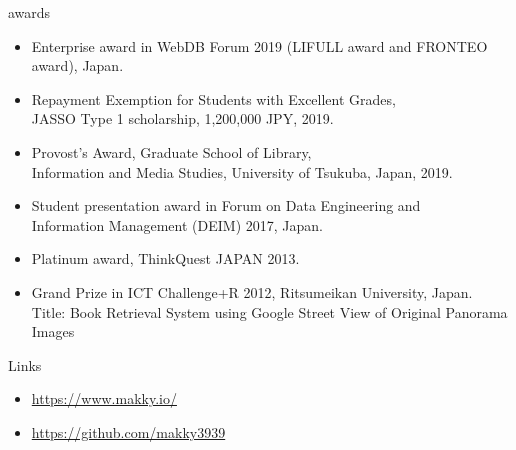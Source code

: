 \documentclass{resume} %
\begin{document}
\begin{rSection}{awards}
\begin{itemize}
  \item Enterprise award in WebDB Forum 2019 (LIFULL award and FRONTEO award), Japan.
  \item Repayment Exemption for Students with Excellent Grades, \\JASSO Type 1 scholarship, 1,200,000 JPY, 2019.
  \item Provost’s Award, Graduate School of Library, \\Information and Media Studies, University of Tsukuba, Japan, 2019.
  \item Student presentation award in Forum on Data Engineering
  and \\Information Management (DEIM) 2017, Japan.
  \item Platinum award, ThinkQuest JAPAN 2013. %
  \item Grand Prize in ICT Challenge+R 2012, Ritsumeikan University, Japan. \\Title: Book Retrieval System using Google Street View of Original Panorama Images
\end{itemize}

\end{rSection}


\begin{rSection}{Links}
\begin{itemize}
  \item \url{https://www.makky.io/}
  \item \url{https://github.com/makky3939}
\end{itemize}
\end{rSection}
\end{document}
